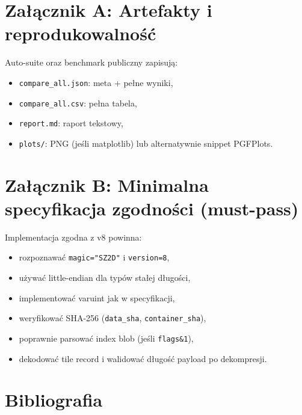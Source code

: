 \documentclass[11pt,a4paper]{article}
\begin{document}
\fi

\appendix

\section{Załącznik A: Artefakty i reprodukowalność}
Auto-suite oraz benchmark publiczny zapisują:
\begin{itemize}
  \item \texttt{compare\_all.json}: meta + pełne wyniki,
  \item \texttt{compare\_all.csv}: pełna tabela,
  \item \texttt{report.md}: raport tekstowy,
  \item \texttt{plots/}: PNG (jeśli matplotlib) lub alternatywnie snippet PGFPlots.
\end{itemize}

\section{Załącznik B: Minimalna specyfikacja zgodności (must-pass)}
Implementacja zgodna z v8 powinna:
\begin{itemize}
  \item rozpoznawać \texttt{magic="SZ2D"} i \texttt{version=8},
  \item używać little-endian dla typów stałej długości,
  \item implementować varuint jak w specyfikacji,
  \item weryfikować SHA-256 (\texttt{data\_sha}, \texttt{container\_sha}),
  \item poprawnie parsować index blob (jeśli \texttt{flags\&1}),
  \item dekodować tile record i walidować długość payload po dekompresji.
\end{itemize}

\clearpage
\section*{Bibliografia}
\end{document}
